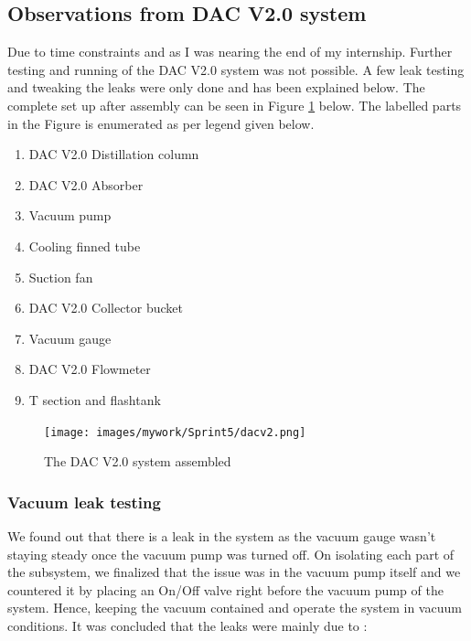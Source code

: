 
\subsection{Observations from DAC V2.0 system}
\label{sec:DAC2.0}

Due to time constraints and as I was nearing the end of my internship. Further testing and running of the DAC V2.0 system was not possible. A few leak testing and tweaking the leaks were only done and has been explained below. The complete set up after assembly can be seen in Figure \ref{fig:dacv2.0} below. The labelled parts in the Figure is enumerated as per legend given below. 

\begin{enumerate}
    \item DAC V2.0 Distillation column 
    \item DAC V2.0 Absorber
    \item Vacuum pump
    \item Cooling finned tube
    \item Suction fan 
    \item DAC V2.0 Collector bucket
    \item Vacuum gauge
    \item DAC V2.0 Flowmeter
    \item T section and flashtank
\end{enumerate}

\begin{figure}[H]
    \centering
    \texttt{[image: images/mywork/Sprint5/dacv2.png]}
    \caption{The DAC V2.0 system assembled}
    \label{fig:dacv2.0}
\end{figure}


\subsubsection{Vacuum leak testing}
\label{sec:DAC2.0leaks}

\noindent We found out that there is a leak in the system as the vacuum gauge wasn't staying steady once the vacuum pump was turned off. On isolating each part of the subsystem, we finalized that the issue was in the vacuum pump itself and we countered it by placing an On/Off valve right before the vacuum pump of the system. Hence, keeping the vacuum contained and operate the system in vacuum conditions. It was concluded that the leaks were mainly due to : 

